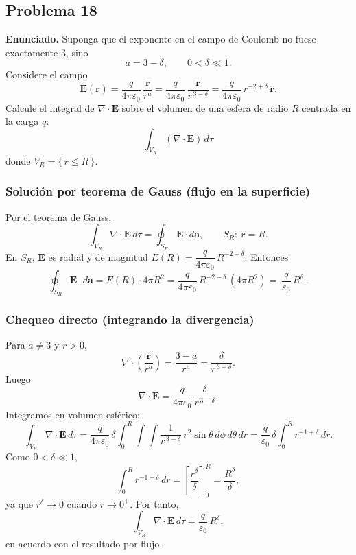 \documentclass{article}
\begin{document}
\subsection{Problema 18} \vspace{0.5cm}

\textbf{Enunciado.} Suponga que el exponente en el campo de Coulomb no fuese exactamente $3$, sino
\[
a=3-\delta,\qquad 0<\delta\ll 1.
\]
Considere el campo
\[
\mathbf E(\mathbf r)=\frac{q}{4\pi\varepsilon_0}\,\frac{\mathbf r}{r^{a}}
=\frac{q}{4\pi\varepsilon_0}\,\frac{\mathbf r}{r^{\,3-\delta}}
=\frac{q}{4\pi\varepsilon_0}\,r^{-2+\delta}\,\hat{\mathbf r}.
\]
Calcule el integral de $\nabla\!\cdot\!\mathbf E$ sobre el volumen de una esfera de radio $R$ centrada en la carga $q$:
\[
\boxed{\;\displaystyle \int_{V_R} (\nabla\!\cdot\!\mathbf E)\,d\tau\;}
\]
donde $V_R=\{\,r\le R\,\}$.

\subsubsection*{Solución por teorema de Gauss (flujo en la superficie)}
Por el teorema de Gauss,
\[
\int_{V_R}\nabla\!\cdot\!\mathbf E\,d\tau=\oint_{S_R}\mathbf E\cdot d\mathbf a,
\qquad S_R:\ r=R.
\]
En $S_R$, $\mathbf E$ es radial y de magnitud $E(R)=\dfrac{q}{4\pi\varepsilon_0}\,R^{-2+\delta}$. Entonces
\[
\oint_{S_R}\mathbf E\cdot d\mathbf a
=E(R)\cdot 4\pi R^2
=\frac{q}{4\pi\varepsilon_0}\,R^{-2+\delta}\,(4\pi R^2)
=\boxed{\ \frac{q}{\varepsilon_0}\,R^{\delta}\ }.
\]

\subsubsection*{Chequeo directo (integrando la divergencia)}
Para $a\ne 3$ y $r>0$,
\[
\nabla\!\cdot\!\left(\frac{\mathbf r}{r^{a}}\right)=\frac{3-a}{r^{a}}=\frac{\delta}{r^{\,3-\delta}}.
\]
Luego
\[
\nabla\!\cdot\!\mathbf E
=\frac{q}{4\pi\varepsilon_0}\,\frac{\delta}{r^{\,3-\delta}}.
\]
Integramos en volumen esférico:
\[
\int_{V_R}\nabla\!\cdot\!\mathbf E\,d\tau
=\frac{q}{4\pi\varepsilon_0}\,\delta\int_{0}^{R}\!\!\int\!\!\int
\frac{1}{r^{\,3-\delta}}\,r^{2}\sin\theta\,d\phi\,d\theta\,dr
=\frac{q}{\varepsilon_0}\,\delta\int_{0}^{R} r^{-1+\delta}\,dr.
\]
Como $0<\delta\ll1$,
\[
\int_{0}^{R} r^{-1+\delta}\,dr=\left[\frac{r^{\delta}}{\delta}\right]_{0}^{R}= \frac{R^{\delta}}{\delta},
\]
ya que $r^{\delta}\to 0$ cuando $r\to 0^{+}$. Por tanto,
\[
\int_{V_R}\nabla\!\cdot\!\mathbf E\,d\tau=\frac{q}{\varepsilon_0}\,R^{\delta},
\]
en acuerdo con el resultado por flujo.
\end{document}
